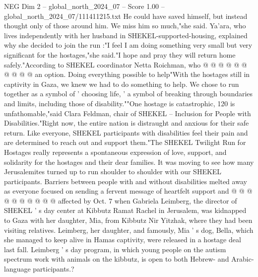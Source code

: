 \begin{textsample}{NEG Dim 2 – global\_north\_2024\_07 – Score 1.00 – global\_north\_2024\_07/111411215.txt}
He could have saved himself, but instead thought only of those around him.
We miss him so much,"she said.
Ya'ara, who lives independently with her husband in SHEKEL-supported-housing, explained why she decided to join the run :"I feel I am doing something very small but very significant for the hostages,"she said."I hope and pray they will return home safely."According to SHEKEL coordinator Netta Roichman, who @ @ @ @ @ @ @ @ @ @ an option.
Doing everything possible to help"With the hostages still in captivity in Gaza, we knew we had to do something to help.
We chose to run together as a symbol of ' choosing life, ' a symbol of breaking through boundaries and limits, including those of disability.""One hostage is catastrophic, 120 is unfathomable,"said Clara Feldman, chair of SHEKEL -- Inclusion for People with Disabilities."Right now, the entire nation is distraught and anxious for their safe return.
Like everyone, SHEKEL participants with disabilities feel their pain and are determined to reach out and support them."The SHEKEL Twilight Run for Hostages really represents a spontaneous expression of love, support, and solidarity for the hostages and their dear families.
It was moving to see how many Jerusalemites turned up to run shoulder to shoulder with our SHEKEL participants.
Barriers between people with and without disabilities melted away as everyone focused on sending a fervent message of heartfelt support and @ @ @ @ @ @ @ @ @ @ affected by Oct. 7 when Gabriela Leimberg, the director of SHEKEL ' s day center at Kibbutz Ramat Rachel in Jerusalem, was kidnapped to Gaza with her daughter, Mia, from Kibbutz Nir Yitzhak, where they had been visiting relatives.
Leimberg, her daughter, and famously, Mia ' s dog, Bella, which she managed to keep alive in Hamas captivity, were released in a hostage deal last fall.
Leimberg ' s day program, in which young people on the autism spectrum work with animals on the kibbutz, is open to both Hebrew- and Arabic-language participants.?

\end{textsample}
